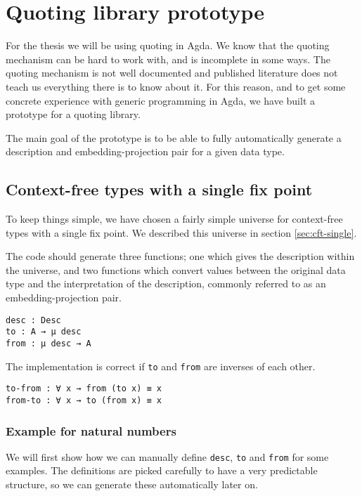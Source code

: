 \section{Quoting library prototype}\label{sec:prototype}

For the thesis we will be using quoting in Agda.
We know that the quoting mechanism can be hard to work with, and is
incomplete in some ways.
The quoting mechanism is not well documented and published literature
does not teach us everything there is to know about it.
For this reason, and to get some concrete experience with generic
programming in Agda, we have built a prototype for a quoting library.

The main goal of the prototype is to be able to fully automatically
generate a description and embedding-projection pair for a given data
type.

\subsection{Context-free types with a single fix point}

To keep things simple, we have chosen a fairly simple universe for
context-free types with a single fix point.
We described this universe in section \ref{sec:cft-single}.

The code should generate three functions; one which gives the
description within the universe, and two functions which convert
values between the original data type and the interpretation of the
description, commonly referred to as an embedding-projection pair.

\begin{verbatim}
desc : Desc
to : A → μ desc
from : μ desc → A
\end{verbatim}

The implementation is correct if \texttt{to} and \texttt{from} are
inverses of each other.

\begin{verbatim}
to-from : ∀ x → from (to x) ≡ x
from-to : ∀ x → to (from x) ≡ x
\end{verbatim}

\subsubsection{Example for natural numbers}

We will first show how we can manually define \texttt{desc},
\texttt{to} and \texttt{from} for some examples.
The definitions are picked carefully to have a very predictable
structure, so we can generate these automatically later on.

